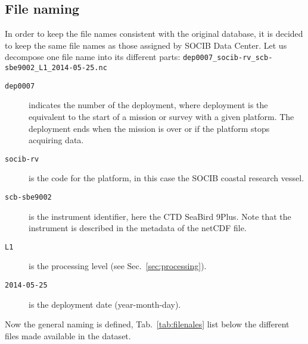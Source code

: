 \documentclass[essd]{copernicus}
\begin{document}
\subsection{File naming}
In order to keep the file names consistent with the original database, it is decided to keep the same file names as those assigned by SOCIB Data Center. Let us decompose one file name into its different parts: 
\texttt{dep0007\_socib-rv\_scb-sbe9002\_L1\_2014-05-25.nc}
\begin{description}
\item[\tt dep0007] indicates the number of the deployment, where deployment is the equivalent to the start of a mission or survey with a given platform. The deployment ends when the mission is over or if the platform stops acquiring data.
\item[\tt socib-rv] is the code for the platform, in this case the SOCIB coastal research vessel.
\item[\tt scb-sbe9002] is the instrument identifier, here the CTD SeaBird 9Plus. Note that the instrument is described in the metadata of the netCDF file.
\item[\tt L1] is the processing level (see Sec.~\ref{sec:processing}).
\item[\tt 2014-05-25] is the deployment date (year-month-day).
\end{description}
Now the general naming is defined, Tab.~\ref{tab:filenales} list below the different files made available in the dataset.
\end{document}
